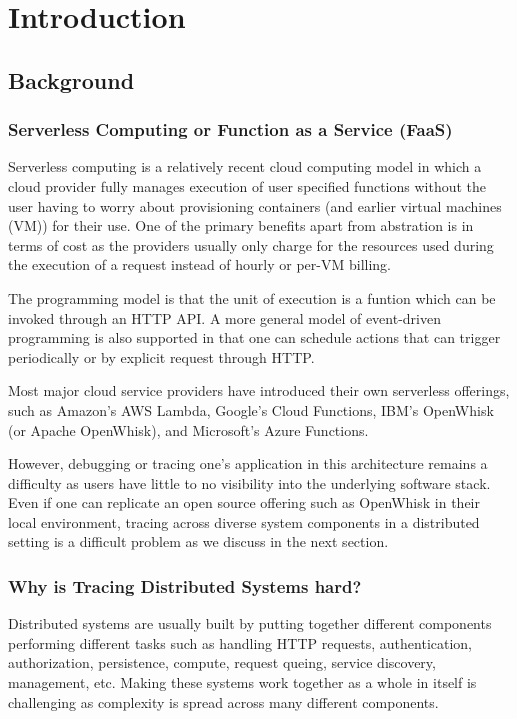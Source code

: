 \chapter{Introduction}

\section{Background}

\subsection{Serverless Computing or Function as a Service (FaaS)}
Serverless computing is a relatively recent cloud computing model in which a cloud provider fully manages execution of user specified functions without the user having to worry about provisioning containers (and earlier virtual machines (VM)) for their use. One of the primary benefits apart from abstration is in terms of cost as the providers usually only charge for the resources used during the execution of a request instead of hourly or per-VM billing.

The programming model is that the unit of execution is a funtion which can be invoked through an HTTP API. A more general model of event-driven programming is also supported in that one can schedule actions that can trigger periodically or by explicit request through HTTP.

Most major cloud service providers have introduced their own serverless offerings, such as Amazon's AWS Lambda, Google's Cloud Functions, IBM's OpenWhisk (or Apache OpenWhisk\cite{web:wsk}), and Microsoft's Azure Functions.

However, debugging or tracing one's application in this architecture remains a difficulty as users have little to no visibility into the underlying software stack. Even if one can replicate an open source offering such as OpenWhisk in their local environment, tracing across diverse system components in a distributed setting is a difficult problem as we discuss in the next section.

\subsection{Why is Tracing Distributed Systems hard?}
Distributed systems are usually built by putting together different components performing different tasks such as handling HTTP requests, authentication, authorization, persistence, compute, request queing, service discovery, management, etc. Making these systems work together as a whole in itself is challenging as complexity is spread across many different components.

